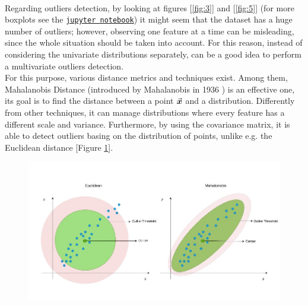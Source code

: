 \documentclass[letterpaper]{article}
\begin{document}
	\paragraph{} Regarding outliers detection, by looking at figures [\ref{fig:3}] and [\ref{fig:5}] (for more boxplots see the \href{https://nbviewer.jupyter.org/github/angelicaurba/south-german-Credit-Dataset/blob/main/dataset_analysis.ipynb}{\texttt{jupyter notebook}}) it might seem that the dataset has a huge number of outliers; however, observing one feature at a time can be misleading, since the whole situation should be taken into account. For this reason, instead of considering the univariate distributions separately, can be a good idea to perform a multivariate outliers detection. \\
	For this purpose, various distance metrics and techniques exist. Among them, Mahalanobis Distance (introduced by Mahalanobis in 1936 \cite{mahalanobis1936}) is an effective one, its goal is to find the distance between a point $ \va*{x} $ and a distribution. Differently from other techniques, it can manage distributions where every feature has a different scale and variance. Furthermore, by using the covariance matrix, it is able to detect outliers basing on the distribution of points, unlike e.g. the Euclidean distance [Figure \ref{fig:6}].
	\begin{figure}[h]
		\centering
		\includegraphics[width=.85\textwidth]{images/euclidean_vs_mahalanobis.jpeg}
		\label{fig:6}
	\end{figure}
	
\end{document}
